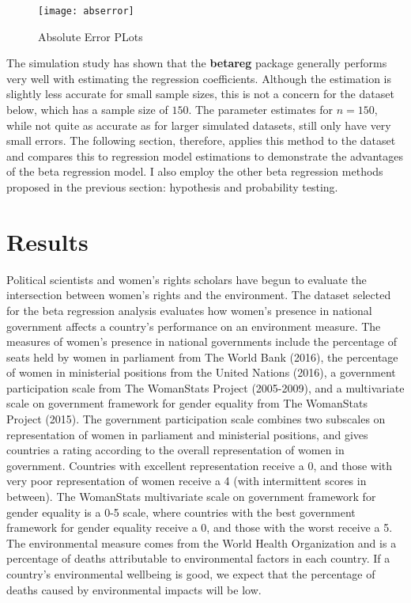 \documentclass{svproc}
\begin{document}
\begin{figure}
\begin{center}
\caption{Absolute Error PLots}
\texttt{[image: abserror]}
\label{abserror}
\smallskip
\end{center}
\end{figure}

The simulation study has shown that the \textbf{betareg} package generally performs very well with estimating the regression coefficients. Although the estimation is slightly less accurate for small sample sizes, this is not a concern for the dataset below, which has a sample size of $150$. The parameter estimates for $n=150$, while not quite as accurate as for larger simulated datasets, still only have very small errors. The following section, therefore, applies this method to the dataset and compares this to regression model estimations to demonstrate the advantages of the beta regression model. I also employ the other beta regression methods proposed in the previous section: hypothesis and probability testing. 

\section{Results}

Political scientists and women's rights scholars have begun to evaluate the intersection between women's rights and the environment. The dataset selected for the beta regression analysis evaluates how women's presence in national government affects a country's performance on an environment measure. The measures of women's presence in national governments include the percentage of seats held by women in parliament from The World Bank (2016), the percentage of women in ministerial positions from the United Nations (2016), a government participation scale from The WomanStats Project (2005-2009), and a multivariate scale on government framework for gender equality from The WomanStats Project (2015). The government participation scale combines two subscales on representation of women in parliament and ministerial positions, and gives countries a rating according to the overall representation of women in government. Countries with excellent representation receive a 0, and those with very poor representation of women receive a 4 (with intermittent scores in between). The WomanStats multivariate scale on government framework for gender equality is a 0-5 scale, where countries with the best government framework for gender equality receive a 0, and those with the worst receive a 5. The environmental measure comes from the World Health Organization and is a percentage of deaths attributable to environmental factors in each country. If a country's environmental wellbeing is good, we expect that the percentage of deaths caused by environmental impacts will be low. 
\end{document}
